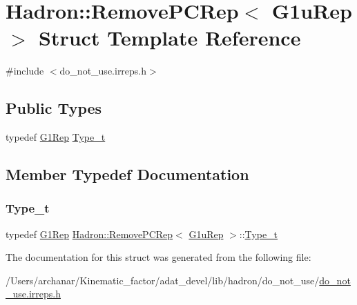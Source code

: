 \hypertarget{structHadron_1_1RemovePCRep_3_01G1uRep_01_4}{}\section{Hadron\+:\+:Remove\+P\+C\+Rep$<$ G1u\+Rep $>$ Struct Template Reference}
\label{structHadron_1_1RemovePCRep_3_01G1uRep_01_4}


{\ttfamily \#include $<$do\+\_\+not\+\_\+use.\+irreps.\+h$>$}

\subsection*{Public Types}
\begin{DoxyCompactItemize}
\item 
typedef \mbox{\hyperlink{structHadron_1_1G1Rep}{G1\+Rep}} \mbox{\hyperlink{structHadron_1_1RemovePCRep_3_01G1uRep_01_4_ad0b4cb2571a6aad91f0bd3daf9ac4df1}{Type\+\_\+t}}
\end{DoxyCompactItemize}


\subsection{Member Typedef Documentation}
\mbox{\label{structHadron_1_1RemovePCRep_3_01G1uRep_01_4_ad0b4cb2571a6aad91f0bd3daf9ac4df1}} 
\subsubsection{\texorpdfstring{Type\_t}{Type\_t}}
{\footnotesize\ttfamily typedef \mbox{\hyperlink{structHadron_1_1G1Rep}{G1\+Rep}} \mbox{\hyperlink{structHadron_1_1RemovePCRep}{Hadron\+::\+Remove\+P\+C\+Rep}}$<$ \mbox{\hyperlink{structHadron_1_1G1uRep}{G1u\+Rep}} $>$\+::\mbox{\hyperlink{structHadron_1_1RemovePCRep_3_01G1uRep_01_4_ad0b4cb2571a6aad91f0bd3daf9ac4df1}{Type\+\_\+t}}}



The documentation for this struct was generated from the following file\+:\begin{DoxyCompactItemize}
\item 
/\+Users/archanar/\+Kinematic\+\_\+factor/adat\+\_\+devel/lib/hadron/do\+\_\+not\+\_\+use/\mbox{\hyperlink{do__not__use_8irreps_8h}{do\+\_\+not\+\_\+use.\+irreps.\+h}}\end{DoxyCompactItemize}
